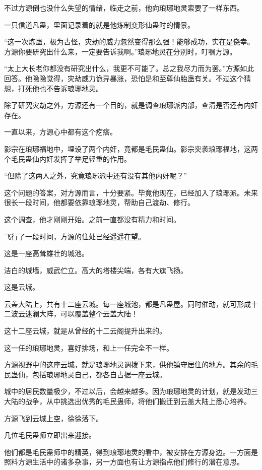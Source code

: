 \begin{this_body}
不过方源倒也没什么失望的情绪，临走之前，他向琅琊地灵索要了一样东西。

一只信道凡蛊，里面记录着的就是他炼制变形仙蛊时的情景。

“这一次炼蛊，极为古怪，灾劫的威力忽然变得那么强！能够成功，实在是侥幸。方源你要研究出什么来，一定要告诉我啊。”琅琊地灵在分别时，叮嘱方源。

“太上大长老你都没有研究出什么，我更不可能了。总之我尽力而为罢。”方源如此回答。他隐隐觉得，灾劫威力诡异暴涨，恐怕是和至尊仙胎蛊有关。不过这个猜想，打死他也不告诉琅琊地灵。

除了研究灾劫之外，方源还有一个目的，就是调查琅琊派内部，查清是否还有内奸存在。

一直以来，方源心中都有这个疙瘩。

影宗在琅琊福地中，埋设了两个内奸，竟都是毛民蛊仙。影宗突袭琅琊福地，这两个毛民蛊仙内奸发挥了举足轻重的作用。

“但除了这两人之外，究竟琅琊派中还有没有其他内奸呢？”

这个问题的答案，对方源而言，十分要紧。毕竟他现在，已经加入了琅琊派。未来很长一段时间，他都要依靠琅琊地灵，帮助自己渡劫、修行。

这个调查，他才刚刚开始。之前一直都没有精力和时间。

飞行了一段时间，方源的住处已经遥遥在望。

这是一座高耸雄壮的城池。

洁白的城墙，威武伫立。高大的塔楼尖端，各有大旗飞扬。

这是云城。

云盖大陆上，共有十二座云城。每一座城池，都是凡蛊屋。同时催动，就可形成十二波云迷澜大阵，可以覆盖整个云盖大陆！

这十二座云城，就是从曾经的十二云阁提升出来的。

这一任的琅琊地灵，喜好排场，和上一任完全不一样。

方源视野中的这座云城，就是琅琊地灵调拨下来，供他镇守居住的地方。其余的毛民蛊仙，包括琅琊地灵自己，都各自占据一座云城。

城中的居民数量极少，不过以后，会越来越多。因为琅琊地灵的计划，就是发动三大陆的战争，从中挑选出优秀的毛民蛊师，将他们搬迁到云盖大陆上悉心培养。

方源飞到云城上空，徐徐落下。

几位毛民蛊师立即出来迎接。

他们都是毛民蛊师中的精英，得到琅琊地灵的看中，被安排在方源身边。一方面是照料方源生活中的诸多杂事，另一方面也有让方源指点他们修行的潜在意思。


\end{this_body}
